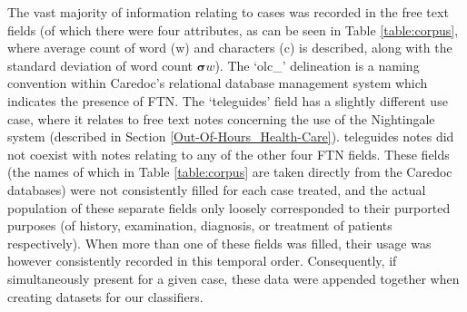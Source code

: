  The vast majority of information relating to cases was recorded in the free text fields (of which there were four attributes, as can be seen in Table \ref{table:corpus}, where average count of word (w) and characters (c) is described, along with the standard deviation of word count $\mathbf{\sigma}w$). The `olc\_' delineation is a naming convention within Caredoc's relational database management system which indicates the presence of FTN. The `teleguides' field has a slightly different use case, where it relates to free text notes concerning the use of the Nightingale system (described in Section \ref{Out-Of-Hours_Health-Care}). teleguides notes did not coexist with notes relating to any of the other four FTN fields. 
 These fields (the names of which in Table \ref{table:corpus} are taken directly from the Caredoc databases) were not consistently filled for each case treated, and the actual population of these separate fields only loosely corresponded to their purported purposes (of history, examination, diagnosis, or treatment of patients respectively). When more than one of these fields was filled, their usage was however consistently recorded in this temporal order. Consequently, if simultaneously present for a given case, these data were appended together when creating datasets for our classifiers.
 
 \newcommand*{\thead}[1]{\multicolumn{1}{c}{\bfseries #1}}


